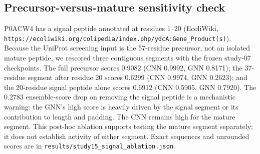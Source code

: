\subsection{Precursor-versus-mature sensitivity check}
\label{sec:signal}
P0ACW4 has a signal peptide annotated at residues 1--20 (EcoliWiki,
\texttt{https://ecoliwiki.org/colipedia/index.php/ydcA:Gene\_Product(s)}).
Because the UniProt screening input is the 57-residue precursor, not an
isolated mature peptide, we rescored three contiguous segments with the
frozen study-07 checkpoints. The full precursor scores 0.9082 (CNN
0.9992, GNN 0.8171); the 37-residue segment after residue 20 scores
0.6299 (CNN 0.9974, GNN 0.2623); and the 20-residue signal peptide alone
scores 0.6912 (CNN 0.5905, GNN 0.7920). The $0.2783$ ensemble-score drop
on removing the signal peptide is a mechanistic warning: the GNN's high
score is heavily driven by the signal segment or its contribution to length
and padding. The CNN remains high for the mature segment. This post-hoc
ablation supports testing the mature segment separately; it does not
establish activity of either segment. Exact sequences and unrounded scores
are in \texttt{results/study15\_signal\_ablation.json}.
